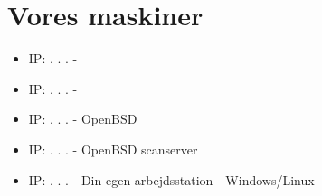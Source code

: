 \documentclass[a4paper,11pt,notitlepage]{oevelser}
\begin{document}
\section*{Vores maskiner}
\begin{itemize}
\item IP: \hskip 15mm .\hskip 15mm .\hskip 15mm .\hskip 15mm -
\item IP: \hskip 15mm .\hskip 15mm .\hskip 15mm .\hskip 15mm -
\item IP: \hskip 15mm .\hskip 15mm .\hskip 15mm .\hskip 15mm -
  OpenBSD
\item IP: \hskip 15mm .\hskip 15mm .\hskip 15mm .\hskip 15mm -
  OpenBSD scanserver
\item IP: \hskip 15mm .\hskip 15mm .\hskip 15mm .\hskip 15mm - Din egen
  arbejdsstation - Windows/Linux
\end{itemize}



%










%



\end{document}

